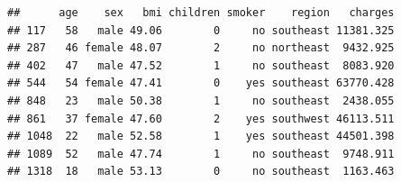 \documentclass[
]{article}
\newenvironment{Shaded}{\begin{snugshade}}{\end{snugshade}}
\newcommand{\CommentTok}[1]{\textcolor[rgb]{0.56,0.35,0.01}{\textit{#1}}}
\newcommand{\KeywordTok}[1]{\textcolor[rgb]{0.13,0.29,0.53}{\textbf{#1}}}
\newcommand{\NormalTok}[1]{#1}
\newcommand{\OperatorTok}[1]{\textcolor[rgb]{0.81,0.36,0.00}{\textbf{#1}}}
\newcommand{\StringTok}[1]{\textcolor[rgb]{0.31,0.60,0.02}{#1}}
\begin{document}
\begin{Shaded}
\end{Shaded}

\begin{verbatim}
##      age    sex   bmi children smoker    region   charges
## 117   58   male 49.06        0     no southeast 11381.325
## 287   46 female 48.07        2     no northeast  9432.925
## 402   47   male 47.52        1     no southeast  8083.920
## 544   54 female 47.41        0    yes southeast 63770.428
## 848   23   male 50.38        1     no southeast  2438.055
## 861   37 female 47.60        2    yes southwest 46113.511
## 1048  22   male 52.58        1    yes southeast 44501.398
## 1089  52   male 47.74        1     no southeast  9748.911
## 1318  18   male 53.13        0     no southeast  1163.463
\end{verbatim}

\begin{Shaded}
\end{Shaded}
\end{document}
